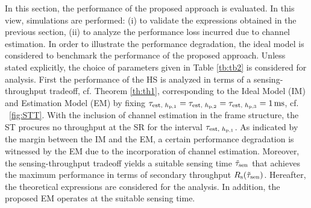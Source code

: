 In this section, the performance of the proposed approach is evaluated. In this view, simulations are performed: (i) to validate the expressions obtained in the previous section, (ii) to analyze the performance loss incurred due to channel estimation. In order to illustrate the performance degradation, the ideal model is considered to benchmark the performance of the proposed approach. Unless stated explicitly, the choice of parameters given in Table \ref{tb:tb2} is considered for analysis. First the performance of the HS is analyzed in terms of a sensing-throughput tradeoff, cf. Theorem \ref{th:th1}, corresponding to the Ideal Model (IM) and Estimation Model (EM) by fixing $\tau_{\text{est, $h_{\text{p,1}}$}} = \tau_{\text{est, $h_{\text{p,2}}$}} =  \tau_{\text{est, $h_{\text{p,3}}$}} = \SI{1}{ms}$, cf. \figurename~\ref{fig:STT}. With the inclusion of channel estimation in the frame structure, the ST procures no throughput at the SR for the interval $\tau_{\text{est, $h_{\text{p,1}}$}}$. As indicated by the margin between the IM and the EM, a certain performance degradation is witnessed by the EM due to the incorporation of channel estimation. Moreover, the sensing-throughput tradeoff yields a suitable sensing time $\tilde{\tau}_{\text{sen}}$ that achieves the maximum performance in terms of secondary throughput $R_{\text{s}}(\tilde{\tau}_{\text{sen}})$. Hereafter, the theoretical expressions are considered for the analysis. In addition, the proposed EM operates at the suitable sensing time. 


